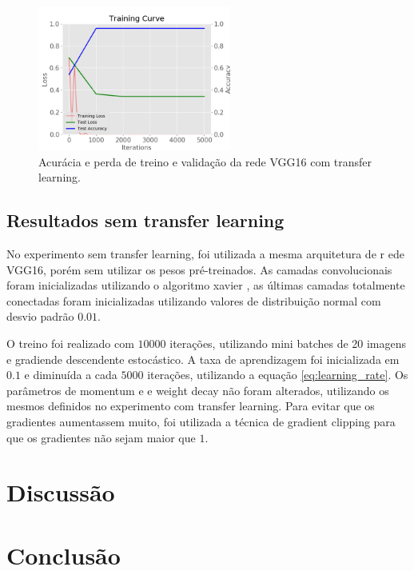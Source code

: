 \documentclass[conference]{IEEEtran}
\begin{document}
  \begin{figure}[!tp]
    \centering
    \includegraphics[width=2.5in]{img/curve_vgg16.png}
    \caption{Acurácia e perda de treino e validação da rede VGG16 com transfer learning.}
    \label{fig:acuracia_vgg16_transfer}
  \end{figure}

  \subsection{Resultados sem transfer learning}

  No experimento sem transfer learning, foi utilizada a mesma arquitetura de r  ede VGG16, porém sem utilizar os pesos pré-treinados. As camadas convolucionais foram inicializadas utilizando o algoritmo xavier \cite{xavier2010}, as últimas camadas totalmente conectadas foram inicializadas utilizando valores de distribuição normal com desvio padrão $0.01$.

  O treino foi realizado com $10000$ iterações, utilizando mini batches de 20 imagens e gradiende descendente estocástico. A taxa de aprendizagem foi inicializada em $0.1$ e diminuída a cada $5000$ iterações, utilizando a equação \ref{eq:learning_rate}. Os parâmetros de momentum e e weight decay não foram alterados, utilizando os mesmos definidos no experimento com transfer learning. Para evitar que os gradientes aumentassem muito, foi utilizada a técnica de gradient clipping para que os gradientes não sejam maior que $1$.


\section{Discussão}




\section{Conclusão}






\end{document}
